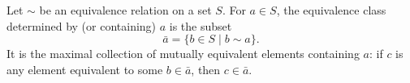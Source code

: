 Let $\sim$ be an equivalence relation on a set $S$. For $a \in S$, the equivalence class determined by (or containing) $a$ is the subset
$$\bar{a} = \{ b \in S \mid b \sim a \}.$$
It is the maximal collection of mutually equivalent elements containing $a$: if $c$ is any element equivalent to some $b \in \bar{a}$, then $c \in \bar{a}$.
